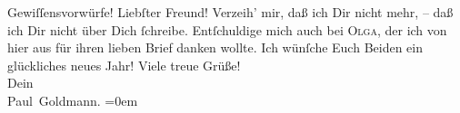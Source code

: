 \begin{ledgroupsized}[t]{13cm}
               Gewiſſensvorwürfe!\pend
           \pstart
           Liebſter Freund! Verzeih’ mir, daß ich Dir nicht mehr, – daß ich Dir nicht über Dich
               ſchreibe. Entſchuldige mich auch bei \textsc{Olga}, der ich von hier aus für
               ihren lieben Brief danken wollte.\pend
           \pstart
           Ich wünſche Euch Beiden ein
               glückliches neues Jahr!\pend
           \pstart
           Viele treue Grüße! {\\[\baselineskip]}Dein {\\[\baselineskip]}\spacefill\mbox{Paul Goldmann.}\pend
           \leftskip=0em{}
         
         \endnumbering{}\end{ledgroupsized}  \newcommand{\dateiname}{L03231}\newcommand{\titel}{Paul Goldmann an Arthur Schnitzler, 28. 12. [1902]}\newcommand{\editorInnen}{Martin Anton Müller und Laura Untner}
      